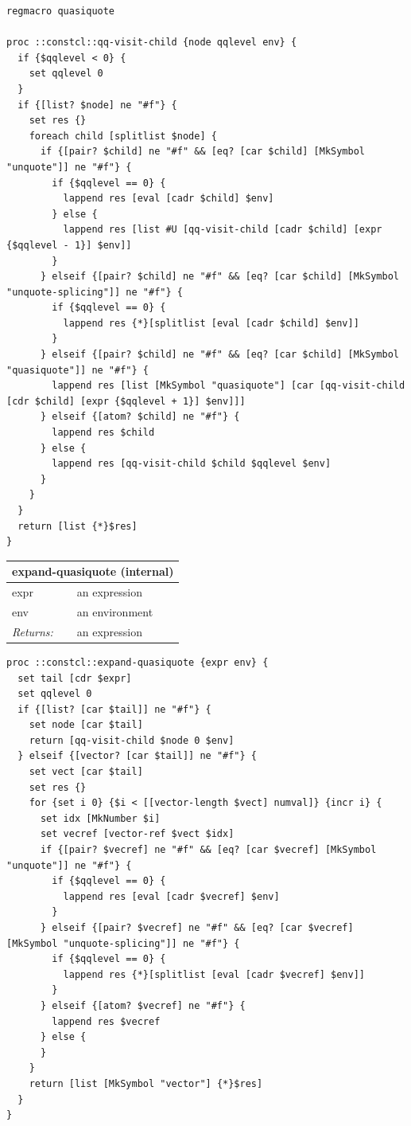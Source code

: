 \documentclass[twoside,9pt]{report}
\begin{document}
\noindent\makebox[\linewidth]{\rule{\linewidth}{0.4pt}}
\begin{lstlisting}
regmacro quasiquote
 
proc ::constcl::qq-visit-child {node qqlevel env} {
  if {$qqlevel < 0} {
    set qqlevel 0
  }
  if {[list? $node] ne "#f"} {
    set res {}
    foreach child [splitlist $node] {
      if {[pair? $child] ne "#f" && [eq? [car $child] [MkSymbol "unquote"]] ne "#f"} {
        if {$qqlevel == 0} {
          lappend res [eval [cadr $child] $env]
        } else {
          lappend res [list #U [qq-visit-child [cadr $child] [expr {$qqlevel - 1}] $env]]
        }
      } elseif {[pair? $child] ne "#f" && [eq? [car $child] [MkSymbol "unquote-splicing"]] ne "#f"} {
        if {$qqlevel == 0} {
          lappend res {*}[splitlist [eval [cadr $child] $env]]
        }
      } elseif {[pair? $child] ne "#f" && [eq? [car $child] [MkSymbol "quasiquote"]] ne "#f"} {
        lappend res [list [MkSymbol "quasiquote"] [car [qq-visit-child [cdr $child] [expr {$qqlevel + 1}] $env]]] 
      } elseif {[atom? $child] ne "#f"} {
        lappend res $child
      } else {
        lappend res [qq-visit-child $child $qqlevel $env]
      }
    }
  }
  return [list {*}$res]
}
\end{lstlisting}
\noindent\makebox[\linewidth]{\rule{\linewidth}{0.4pt}}
\begin{tabular}{ |l l| }
\hline
\multicolumn{2}{|l|}{expand-quasiquote (internal)} \\
\hline
expr & an expression \\
env & an environment \\
\textit{Returns:} & an expression \\
\hline
\end{tabular}

\noindent\makebox[\linewidth]{\rule{\linewidth}{0.4pt}}
\begin{lstlisting}
proc ::constcl::expand-quasiquote {expr env} {
  set tail [cdr $expr]
  set qqlevel 0
  if {[list? [car $tail]] ne "#f"} {
    set node [car $tail]
    return [qq-visit-child $node 0 $env]
  } elseif {[vector? [car $tail]] ne "#f"} {
    set vect [car $tail]
    set res {}
    for {set i 0} {$i < [[vector-length $vect] numval]} {incr i} {
      set idx [MkNumber $i]
      set vecref [vector-ref $vect $idx]
      if {[pair? $vecref] ne "#f" && [eq? [car $vecref] [MkSymbol "unquote"]] ne "#f"} {
        if {$qqlevel == 0} {
          lappend res [eval [cadr $vecref] $env]
        }
      } elseif {[pair? $vecref] ne "#f" && [eq? [car $vecref] [MkSymbol "unquote-splicing"]] ne "#f"} {
        if {$qqlevel == 0} {
          lappend res {*}[splitlist [eval [cadr $vecref] $env]]
        }
      } elseif {[atom? $vecref] ne "#f"} {
        lappend res $vecref
      } else {
      }
    }
    return [list [MkSymbol "vector"] {*}$res]
  }
}
\end{lstlisting}
\noindent\makebox[\linewidth]{\rule{\linewidth}{0.4pt}}
\end{document}
